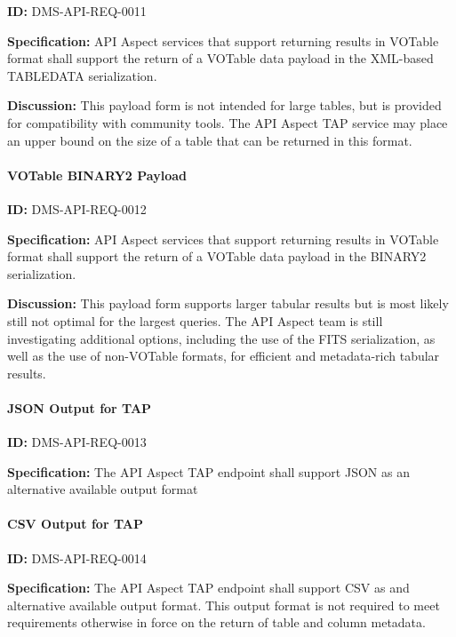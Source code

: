 \documentclass[SE,toc,lsstdraft]{lsstdoc}
\begin{document}
\label{DMS-API-REQ-0011}
\textbf{ID:} DMS-API-REQ-0011

\textbf{Specification:}
API Aspect services that support returning results in VOTable format shall support the return of a VOTable data payload in the XML-based TABLEDATA serialization.

\textbf{Discussion:}
This payload form is not intended for large tables, but is provided for compatibility with community tools.  The API Aspect TAP service may place an upper bound on the size of a table that can be returned in this format.

\paragraph{VOTable BINARY2 Payload}\hfill  %

\label{DMS-API-REQ-0012}
\textbf{ID:} DMS-API-REQ-0012

\textbf{Specification:}
API Aspect services that support returning results in VOTable format shall support the return of a VOTable data payload in the BINARY2 serialization.

\textbf{Discussion:}
This payload form supports larger tabular results but is most likely still not optimal for the largest queries.  The API Aspect team is still investigating additional options, including the use of the FITS serialization, as well as the use of non-VOTable formats, for efficient and metadata-rich tabular results.

\paragraph{JSON Output for TAP}\hfill  %

\label{DMS-API-REQ-0013}
\textbf{ID:} DMS-API-REQ-0013

\textbf{Specification:}
The API Aspect TAP endpoint shall support JSON as an alternative available output format

\paragraph{CSV Output for TAP}\hfill  %

\label{DMS-API-REQ-0014}
\textbf{ID:} DMS-API-REQ-0014

\textbf{Specification:}
The API Aspect TAP endpoint shall support CSV as and alternative available output format.  This output format is not required to meet requirements otherwise in force on the return of table and column metadata.
\end{document}
